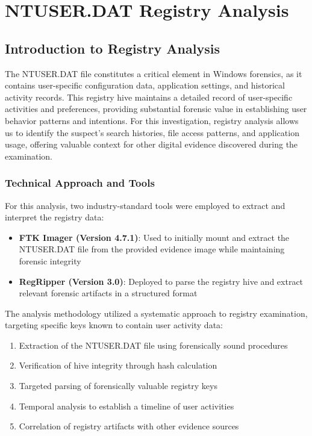 \chapter{NTUSER.DAT Registry Analysis}

\section{Introduction to Registry Analysis}
The NTUSER.DAT file constitutes a critical element in Windows forensics, as it contains user-specific configuration data, application settings, and historical activity records. This registry hive maintains a detailed record of user-specific activities and preferences, providing substantial forensic value in establishing user behavior patterns and intentions. For this investigation, registry analysis allows us to identify the suspect's search histories, file access patterns, and application usage, offering valuable context for other digital evidence discovered during the examination.

\subsection{Technical Approach and Tools}
For this analysis, two industry-standard tools were employed to extract and interpret the registry data:

\begin{itemize}
    \small
    \item \textbf{FTK Imager (Version 4.7.1)}: Used to initially mount and extract the NTUSER.DAT file from the provided evidence image while maintaining forensic integrity
    \item \textbf{RegRipper (Version 3.0)}: Deployed to parse the registry hive and extract relevant forensic artifacts in a structured format
\end{itemize}

The analysis methodology utilized a systematic approach to registry examination, targeting specific keys known to contain user activity data:

\begin{enumerate}
    \item Extraction of the NTUSER.DAT file using forensically sound procedures
    \item Verification of hive integrity through hash calculation
    \item Targeted parsing of forensically valuable registry keys
    \item Temporal analysis to establish a timeline of user activities
    \item Correlation of registry artifacts with other evidence sources
\end{enumerate}

